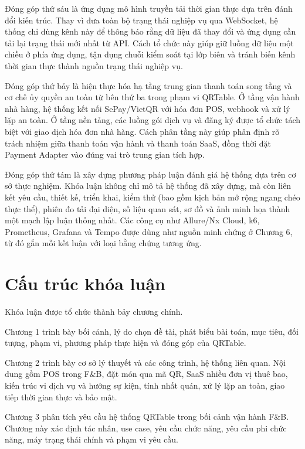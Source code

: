 Đóng góp thứ sáu là ứng dụng mô hình truyền tải thời gian thực dựa trên đánh đổi kiến trúc. Thay vì đưa toàn bộ trạng thái nghiệp vụ qua WebSocket, hệ thống chỉ dùng kênh này để thông báo rằng dữ liệu đã thay đổi và ứng dụng cần tải lại trạng thái mới nhất từ API. Cách tổ chức này giúp giữ luồng dữ liệu một chiều ở phía ứng dụng, tận dụng chuỗi kiểm soát tại lớp biên và tránh biến kênh thời gian thực thành nguồn trạng thái nghiệp vụ.

Đóng góp thứ bảy là hiện thực hóa hạ tầng trung gian thanh toán song tầng và cơ chế ủy quyền an toàn từ bên thứ ba trong phạm vi QRTable. Ở tầng vận hành nhà hàng, hệ thống kết nối SePay/VietQR với hóa đơn POS, webhook và xử lý lặp an toàn. Ở tầng nền tảng, các luồng gói dịch vụ và đăng ký được tổ chức tách biệt với giao dịch hóa đơn nhà hàng. Cách phân tầng này giúp phân định rõ trách nhiệm giữa thanh toán vận hành và thanh toán SaaS, đồng thời đặt Payment Adapter vào đúng vai trò trung gian tích hợp.

Đóng góp thứ tám là xây dựng phương pháp luận đánh giá hệ thống dựa trên cơ sở thực nghiệm. Khóa luận không chỉ mô tả hệ thống đã xây dựng, mà còn liên kết yêu cầu, thiết kế, triển khai, kiểm thử (bao gồm kịch bản mở rộng ngang chéo thực thể), phiên đo tải đại diện, số liệu quan sát, sơ đồ và ảnh minh họa thành một mạch lập luận thống nhất. Các công cụ như Allure/Nx Cloud, k6, Prometheus, Grafana và Tempo được dùng như nguồn minh chứng ở Chương 6, từ đó gắn mỗi kết luận với loại bằng chứng tương ứng.

\section{Cấu trúc khóa luận}

Khóa luận được tổ chức thành bảy chương chính.

Chương 1 trình bày bối cảnh, lý do chọn đề tài, phát biểu bài toán, mục tiêu, đối tượng, phạm vi, phương pháp thực hiện và đóng góp của QRTable.

Chương 2 trình bày cơ sở lý thuyết và các công trình, hệ thống liên quan. Nội dung gồm POS trong F\&B, đặt món qua mã QR, SaaS nhiều đơn vị thuê bao, kiến trúc vi dịch vụ và hướng sự kiện, tính nhất quán, xử lý lặp an toàn, giao tiếp thời gian thực và bảo mật.

Chương 3 phân tích yêu cầu hệ thống QRTable trong bối cảnh vận hành F\&B. Chương này xác định tác nhân, use case, yêu cầu chức năng, yêu cầu phi chức năng, máy trạng thái chính và phạm vi yêu cầu.

